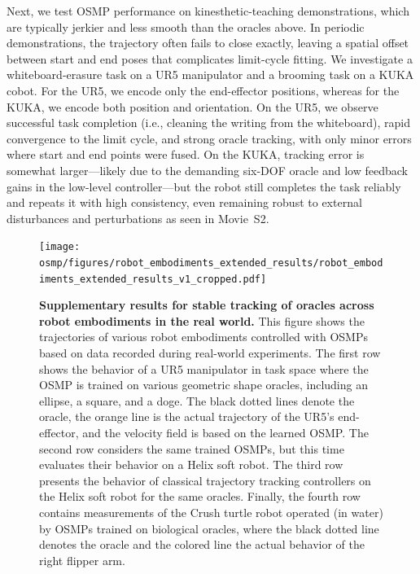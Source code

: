 Next, we test \gls{OSMP} performance on kinesthetic-teaching demonstrations, which are typically jerkier and less smooth than the oracles above. In periodic demonstrations, the trajectory often fails to close exactly, leaving a spatial offset between start and end poses that complicates limit-cycle fitting. We investigate a whiteboard-erasure task on a UR5 manipulator and a brooming task on a KUKA cobot. For the UR5, we encode only the end-effector positions, whereas for the KUKA, we encode both position and orientation. On the UR5, we observe successful task completion (i.e., cleaning the writing from the whiteboard), rapid convergence to the limit cycle, and strong oracle tracking, with only minor errors where start and end points were fused. On the KUKA, tracking error is somewhat larger—likely due to the demanding six-DOF oracle and low feedback gains in the low-level controller—but the robot still completes the task reliably and repeats it with high consistency, even remaining robust to external disturbances and perturbations as seen in Movie~S2.

\begin{figure}[ht!]
    \centering
    \texttt{[image: osmp/figures/robot\_embodiments\_extended\_results/robot\_embodiments\_extended\_results\_v1\_cropped.pdf]}
    \caption{\textbf{Supplementary results for stable tracking of oracles across robot embodiments in the real world.}
    This figure shows the trajectories of various robot embodiments controlled with \glspl{OSMP} based on data recorded during real-world experiments.
    The first row shows the behavior of a UR5 manipulator in task space where the \gls{OSMP} is trained on various geometric shape oracles, including an ellipse, a square, and a doge. The black dotted lines denote the oracle, the orange line is the actual trajectory of the UR5's end-effector, and the velocity field is based on the learned \gls{OSMP}.
    The second row considers the same trained \glspl{OSMP}, but this time evaluates their behavior on a Helix soft robot.
    The third row presents the behavior of classical trajectory tracking controllers on the Helix soft robot for the same oracles.
    Finally, the fourth row contains measurements of the Crush turtle robot operated (in water) by \glspl{OSMP} trained on biological oracles, where the black dotted line denotes the oracle and the colored line the actual behavior of the right flipper arm. 
    }
    \label{fig:osmp:robot_embodiments_extended_results}
\end{figure}

